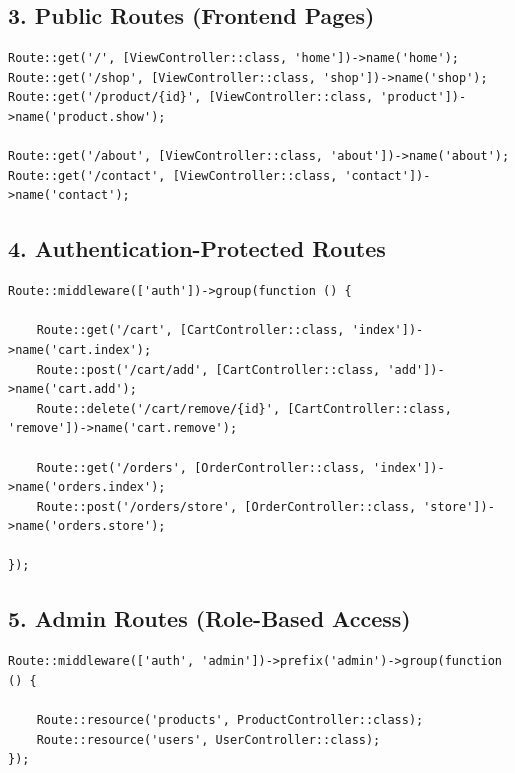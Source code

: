 \documentclass[12pt,a4paper]{article}
\begin{document}
\subsection{3. Public Routes (Frontend Pages)}

\begin{verbatim}
Route::get('/', [ViewController::class, 'home'])->name('home');
Route::get('/shop', [ViewController::class, 'shop'])->name('shop');
Route::get('/product/{id}', [ViewController::class, 'product'])->name('product.show');

Route::get('/about', [ViewController::class, 'about'])->name('about');
Route::get('/contact', [ViewController::class, 'contact'])->name('contact');
\end{verbatim}

\subsection{4. Authentication-Protected Routes}

\begin{verbatim}
Route::middleware(['auth'])->group(function () {

    Route::get('/cart', [CartController::class, 'index'])->name('cart.index');
    Route::post('/cart/add', [CartController::class, 'add'])->name('cart.add');
    Route::delete('/cart/remove/{id}', [CartController::class, 'remove'])->name('cart.remove');

    Route::get('/orders', [OrderController::class, 'index'])->name('orders.index');
    Route::post('/orders/store', [OrderController::class, 'store'])->name('orders.store');

});
\end{verbatim}

\subsection{5. Admin Routes (Role-Based Access)}

\begin{verbatim}
Route::middleware(['auth', 'admin'])->prefix('admin')->group(function () {

    Route::resource('products', ProductController::class);
    Route::resource('users', UserController::class);
});
\end{verbatim}
\end{document}
